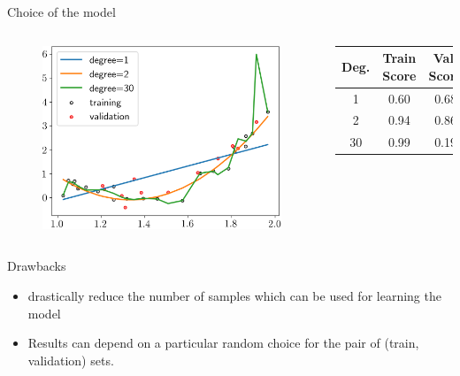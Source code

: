 \documentclass[handout]{beamer}
\begin{document}
\begin{frame}{Choice of the model}
\begin{columns}

    \begin{figure}
    \includegraphics[width=\textwidth]{fig/L1/modelchoice.png}
    \end{figure}

\begin{table}
    \centering
    \begin{tabular}{c|c|c}
        Deg. & Train Score & Val. Score \\
        \hline
        1 & 0.60 & 0.68\\
        2 & 0.94 & 0.86\\
        30 & 0.99 & 0.19 \\
    \end{tabular}
    \end{table}
\end{columns}
\pause
\begin{block}{Drawbacks}
\begin{itemize}
    \item drastically reduce the number of samples which can be used for learning the model
    \item Results  can depend on a particular random choice for the pair of (train, validation) sets.
\end{itemize}
\end{block}
\end{frame}
\end{document}
